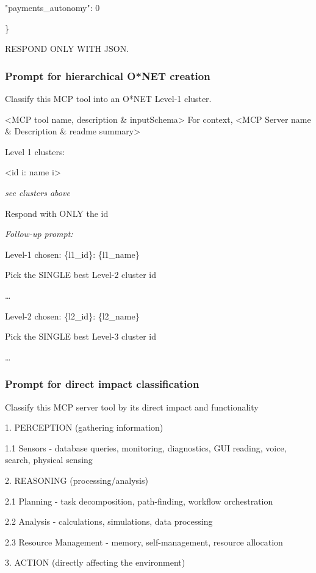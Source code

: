 \documentclass[manuscript,screen,nonacm,oneside]{acmart}
\begin{document}
"payments\_autonomy": 0

\}

RESPOND ONLY WITH JSON.

\subsubsection{Prompt for hierarchical O*NET creation}
\label{app:onet-prompt}

Classify this MCP tool into an O*NET Level-1 cluster.

\textless MCP tool name, description \& inputSchema\textgreater{} For context, \textless MCP Server name \& Description \& readme summary\textgreater{}

Level 1 clusters:

\textless id i: name i\textgreater{}

\textit{see clusters above}

Respond with ONLY the id

\textit{Follow-up prompt:}

Level-1 chosen: \{l1\_id\}: \{l1\_name\}

Pick the SINGLE best Level-2 cluster id

\ldots{}

Level-2 chosen: \{l2\_id\}: \{l2\_name\}

Pick the SINGLE best Level-3 cluster id

\ldots{}

\subsubsection{Prompt for direct impact classification}

Classify this MCP server tool by its direct impact and functionality

1. PERCEPTION (gathering information)

1.1 Sensors - database queries, monitoring, diagnostics, GUI reading, voice, search, physical sensing

2. REASONING (processing/analysis)

2.1 Planning - task decomposition, path-finding, workflow orchestration

2.2 Analysis - calculations, simulations, data processing

2.3 Resource Management - memory, self-management, resource allocation

3. ACTION (directly affecting the environment)
\end{document}
